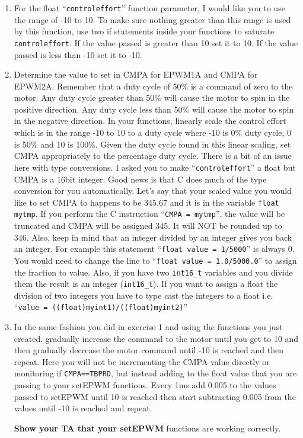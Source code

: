 \documentclass[11pt]{article}
\begin{document}
\begin{enumerate}
        \item For the float “\texttt{controleffort}” function parameter, I would like you to use the range of -10 to 10. To make sure nothing greater than this range is used by this function, use two if statements inside your functions to saturate \texttt{controleffort}. If the value passed is greater than 10 set it to 10. If the value passed is less than -10 set it to -10.
        \item Determine the value to set in CMPA for EPWM1A and CMPA for EPWM2A. Remember that a duty cycle of 50\% is a command of zero to the motor. Any duty cycle greater than 50\% will cause the motor to spin in the positive direction. Any duty cycle less than 50\% will cause the motor to spin in the negative direction. In your functions, linearly scale the control effort which is in the range -10 to 10 to a duty cycle where -10 is 0\% duty cycle, 0 is 50\% and 10 is 100\%. Given the duty cycle found in this linear scaling, set CMPA appropriately to the percentage duty cycle. There is a bit of an issue here with type conversions. I asked you to make “\texttt{controleffort}” a float but CMPA is a 16bit integer. Good news is that C does much of the type conversion for you automatically. Let’s say that your scaled value you would like to set CMPA to happens to be 345.67 and it is in the variable \texttt{float mytmp}. If you perform the C instruction “\texttt{CMPA = mytmp}”, the value will be truncated and CMPA will be assigned 345. It will NOT be rounded up to 346. Also, keep in mind that an integer divided by an integer gives you back an integer. For example this statement “\texttt{float value = 1/5000}” is always 0. You would need to change the line to “\texttt{float value = 1.0/5000.0}” to assign the fraction to value. Also, if you have two \texttt{int16_t} variables and you divide them the result is an integer (\texttt{int16_t}). If you want to assign a float the division of two integers you have to type cast the integers to a float i.e. “\texttt{value = ((float)myint1)/((float)myint2)}”
        \item In the same fashion you did in exercise 1 and using the functions you just created, gradually increase the command to the motor until you get to 10 and then gradually decrease the motor command until -10 is reached and then repeat. Here you will not be incrementing the CMPA value directly or monitoring if \texttt{CMPA==TBPRD}, but instead adding to the float value that you are passing to your setEPWM functions. Every 1ms add 0.005 to the values passed to setEPWM until 10 is reached then start subtracting 0.005 from the values until -10 is reached and repeat.
        \begin{checkoff}
                \textbf{Show your TA that your setEPWM} functions are working correctly.
        \end{checkoff}
\end{enumerate}
%
\end{document}
